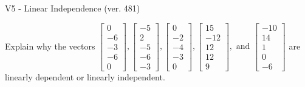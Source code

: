 \begin{exercise}
  \begin{exerciseTitle}V5 - Linear Independence (ver. 481)\end{exerciseTitle}
  \begin{exerciseStatement}
    Explain why the vectors \(\left[\begin{array}{r}
0 \\
-6 \\
-3 \\
-6 \\
0
\end{array}\right] , \left[\begin{array}{r}
-5 \\
2 \\
-5 \\
-6 \\
-3
\end{array}\right] , \left[\begin{array}{r}
0 \\
-2 \\
-4 \\
-3 \\
0
\end{array}\right] , \left[\begin{array}{r}
15 \\
-12 \\
12 \\
12 \\
9
\end{array}\right] , \text{ and } \left[\begin{array}{r}
-10 \\
14 \\
1 \\
0 \\
-6
\end{array}\right]\) are linearly dependent or linearly independent.	



\end{exerciseStatement}
\end{exercise}
